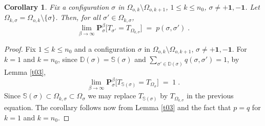 \documentclass[reqno]{amsart}
\newtheorem{corollary}[theorem]{Corollary}
\begin{document}
\begin{corollary}
\label{t05}
Fix a configuration $\sigma$ in $\Omega_{o,k} \setminus
\Omega_{o,k+1}$, $1\le k\le n_0$, $\sigma \not = + {{\mathbf 1}}, - {{\mathbf 1}}$.
Let $\Omega_{k, \sigma} = \Omega_{o,k} \setminus \{\sigma\}$.  
Then, for all $\sigma'\in \Omega_{k, \sigma}$,
\begin{equation*}
\lim_{\beta\to\infty} {{\mathbf P}}^\beta_\sigma \big[ T_{\sigma'} = 
T_{\Omega_{k, \sigma}} \big] \;=\; p(\sigma, \sigma')\;.
\end{equation*} 
\end{corollary}

\begin{proof}
Fix $1\le k\le n_0$ and a configuration $\sigma$ in $\Omega_{o,k}
\setminus \Omega_{o,k+1}$, $\sigma \not = + {{\mathbf 1}}, - {{\mathbf 1}}$.  For
$k=1$ and $k=n_0$, since ${{\mathbb D}}(\sigma) = {{\mathbb S}}(\sigma)$ and
$\sum_{\sigma'\in {{\mathbb D}}(\sigma)} q(\sigma, \sigma')=1$, by Lemma
\ref{t03},
\begin{equation*}
\lim_{\beta\to\infty} {{\mathbf P}}^\beta_\sigma \big[ T_{{{\mathbb S}}(\sigma)} = 
T_{\Omega_{\sigma}} \big] \;=\; 1\;.
\end{equation*}
Since ${{\mathbb S}}(\sigma)\subset \Omega_{k, \sigma} \subset
\Omega_{\sigma}$ we may replace $T_{{{\mathbb S}}(\sigma)}$ by $T_{\Omega_{k,
    \sigma}}$ in the previous equation. The corollary follows now from
Lemma \ref{t03} and the fact that $p=q$ for $k=1$ and $k=n_0$.


\end{proof}
\end{document}

